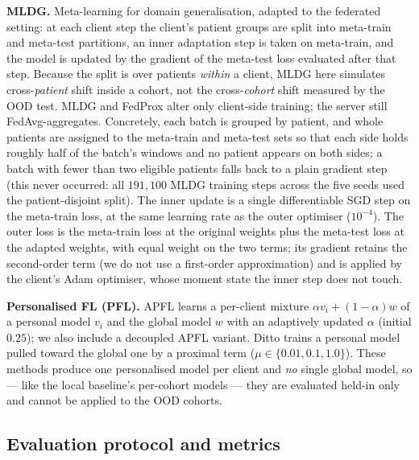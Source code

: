 \documentclass[10pt,letterpaper]{article}
\begin{document}
\textbf{MLDG.} Meta-learning for domain generalisation, adapted to the federated
setting: at each client step the client's patient groups are split into
meta-train and meta-test partitions, an inner adaptation step is taken on
meta-train, and the model is updated by the gradient of the meta-test loss
evaluated after that step. Because the split is over patients \emph{within} a
client, MLDG here simulates cross-\emph{patient} shift inside a cohort, not the
cross-\emph{cohort} shift measured by the OOD test. MLDG and FedProx alter only
client-side training; the server still FedAvg-aggregates. Concretely, each batch
is grouped by patient, and whole patients are assigned to the meta-train and
meta-test sets so that each side holds roughly half of the batch's windows and no
patient appears on both sides; a batch with fewer than two eligible patients
falls back to a plain gradient step (this never occurred: all $191{,}100$ MLDG
training steps across the five seeds used the patient-disjoint split). The inner
update is a single differentiable SGD step on the meta-train loss, at the same
learning rate as the outer optimiser ($10^{-4}$). The outer loss is the
meta-train loss at the original weights plus the meta-test loss at the adapted
weights, with equal weight on the two terms; its gradient retains the
second-order term (we do not use a first-order approximation) and is applied by
the client's Adam optimiser, whose moment state the inner step does not touch.

\textbf{Personalised FL (PFL).} APFL learns a per-client mixture
$\alpha v_i + (1-\alpha)w$ of a personal model $v_i$ and the global model $w$
with an adaptively updated $\alpha$ (initial $0.25$); we also include a decoupled
APFL variant. Ditto trains a personal model pulled toward the global one by a
proximal term ($\mu\in\{0.01,0.1,1.0\}$). These methods produce one personalised
model per client and \emph{no} single global model, so --- like the local
baseline's per-cohort models --- they are evaluated held-in only and cannot be
applied to the OOD cohorts.

\subsection*{Evaluation protocol and metrics}
\end{document}
